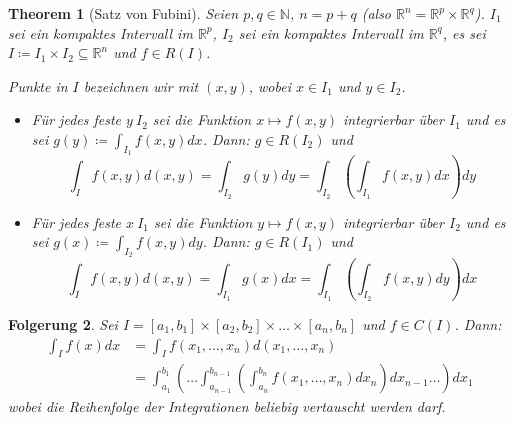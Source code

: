 \documentclass[12pt]{extreport} %
\newcommand{\N}{\mathbb{N}}
\newcommand{\R}{\mathbb{R}}
\theoremstyle{named}
\newtheorem{unnamedtheorem}{Theorem} \counterwithin{unnamedtheorem}{chapter}
\theoremstyle{nnamed}
\theoremstyle{itshape}
\theoremstyle{normal}
\newtheorem{folgerung}[unnamedtheorem]{Folgerung}
\begin{document}
\begin{unnamedtheorem}[Satz von Fubini] \label{20.3:satz}
	Seien $p, q \in \N$, $n = p + q$ (also $\R^{n} = \R^{p} \times \R^{q}$). $I_{1}$ sei ein kompaktes Intervall im $\R^{p}$,  $I_{2}$ sei ein kompaktes Intervall im $\R^{q}$, es sei $I \coloneqq I_{1} \times I_{2} \subseteq \R^{n}$ und $f \in R(I)$.
	
	\bigskip
	
	Punkte in $I$ bezeichnen wir mit $(x, y)$, wobei $x \in I_{1}$ und $y \in I_{2}$. 

	\begin{itemize}
		\item Für jedes feste $y \ I_{2}$ sei die Funktion $x \mapsto f(x, y)$ integrierbar über $I_{1}$ und es sei $g(y) \coloneqq \int_{I_{1}} f(x,y) dx$. Dann: $g \in R(I_{2})$ und
			$$ \int_{I} f(x, y) d(x,y) = \int_{I_{2}} g(y) dy = \int_{I_{2}} \left( \int_{I_{1}} f(x,y) dx \right) dy $$
		\item Für jedes feste $x \ I_{1}$ sei die Funktion $y \mapsto f(x, y)$ integrierbar über $I_{2}$ und es sei $g(x) \coloneqq \int_{I_{2}} f(x,y) dy$. Dann: $g \in R(I_{1})$ und
			$$ \int_{I} f(x, y) d(x,y) = \int_{I_{1}} g(x) dx = \int_{I_{1}} \left( \int_{I_{2}} f(x,y) dy \right) dx $$
	\end{itemize}	
\end{unnamedtheorem}

\begin{folgerung} \label{20.4:folg}
	Sei $I = [a_{1}, b_{1}] \times [a_{2}, b_{2}] \times \dotsc \times [a_{n}, b_{n}]$ und $f \in C(I)$. Dann:
	\begin{align*}
		\int_{I} f(x) dx & = \int_{I} f(x_{1}, \dotsc, x_{n}) d(x_{1}, \dotsc, x_{n}) \\
			& = \int_{a_{1}}^{b_{1}} \left( \dotsc \int_{a_{n-1}}^{b_{n-1}} \left( \int_{a_{n}}^{b_{n}} f(x_{1}, \dotsc, x_{n}) dx_{n} \right) dx_{n-1} \dotsc \right) dx_{1}
	\end{align*}
	wobei die Reihenfolge der Integrationen beliebig vertauscht werden darf.
\end{folgerung}
\end{document}
